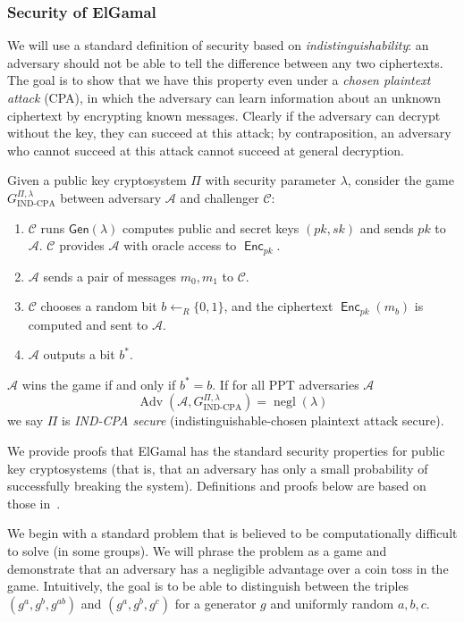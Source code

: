 \documentclass[12pt,a4paper]{article}
\DeclareMathOperator{\negl}{\text{negl}}
\DeclareMathOperator{\Adv}{\text{Adv}}
\DeclareMathOperator{\Enc}{\mathsf{Enc}}
\theoremstyle{definition}
\begin{document}
\subsubsection{Security of ElGamal}
We will use a standard definition of security based on \textit{indistinguishability}: an adversary should not be able to tell the difference between any two ciphertexts. The goal is to show that we have this property even under a \textit{chosen plaintext attack} (CPA), in which the adversary can learn information about an unknown ciphertext by encrypting known messages. Clearly if the adversary can decrypt without the key, they can succeed at this attack; by contraposition, an adversary who cannot succeed at this attack cannot succeed at general decryption.
\begin{definition}
    Given a public key cryptosystem $\Pi$ with security parameter $\lambda$, consider the game $G_{\text{IND-CPA}}^{\Pi,\lambda}$ between adversary $\mathcal{A}$ and challenger $\mathcal{C}$:
    \begin{enumerate}
        \item $\mathcal{C}$ runs $\mathsf{Gen}(\lambda)$ computes public and secret keys $(pk, sk)$ and sends $pk$ to $\mathcal{A}$. $\mathcal{C}$ provides $\mathcal{A}$ with oracle access to $\Enc_{pk}$.
        \item $\mathcal{A}$ sends a pair of messages $m_0, m_1$ to $\mathcal{C}$.
        \item $\mathcal{C}$ chooses a random bit $b\gets_R\{0, 1\}$, and the ciphertext $\Enc_{pk}(m_b)$ is computed and sent to $\mathcal{A}$.
        \item $\mathcal{A}$ outputs a bit $b^*$.
    \end{enumerate}
    $\mathcal{A}$ wins  the game if and only if $b^*=b$. If for all PPT adversaries $\mathcal{A}$
    $$\Adv\left(\mathcal{A},G^{\Pi,\lambda}_{\text{IND-CPA}}\right)=\negl(\lambda)$$
    we say $\Pi$ is \textit{IND-CPA secure} (indistinguishable-chosen plaintext attack secure).
\end{definition}

We provide proofs that ElGamal has the standard security properties for public key cryptosystems (that is, that an adversary has only a small probability of successfully breaking the system). Definitions and proofs below are based on those in~\cite{katz2014introduction}.

We begin with a standard problem that is believed to be computationally difficult to solve (in some groups). We will phrase the problem as a game and demonstrate that an adversary has a negligible advantage over a coin toss in the game. Intuitively, the goal is to be able to distinguish between the triples $(g^a, g^b, g^{ab})$ and $(g^a, g^b, g^c)$ for a generator $g$ and uniformly random $a, b, c$.
\end{document}

